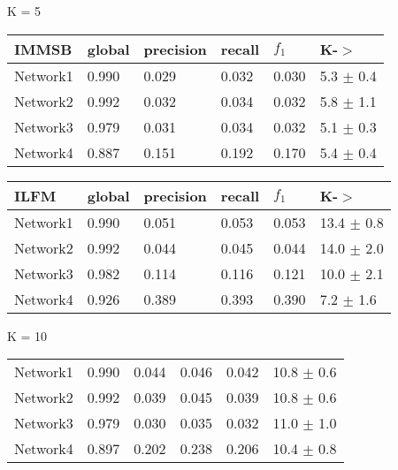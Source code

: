 

\begin{table*}[h] \label{table:unbalanced}
\caption{Predictive Performance for Synthetic datasets}
	\begin{minipage}[h]{0.45\linewidth} 
K = 5\hspace{5pt}
\begin{tabular}{llllll}
\hline
 IMMSB   &   global &   precision &   recall & $f_1$ &    K-\ensuremath{>} \\
\hline
Network1        &    0.990 &       0.029 &    0.032 & 0.030 & 5.3 $\pm$ 0.4 \\
Network2       &    0.992 &       0.032 &    0.034 &  0.032 & 5.8 $\pm$ 1.1 \\
Network3        &    0.979 &       0.031 &    0.034 & 0.032 & 5.1 $\pm$ 0.3     \\
Network4       &    0.887 &       0.151 &    0.192 &  0.170 & 5.4 $\pm$ 0.4 \\

\hline
\end{tabular}
\end{minipage}
\hspace{0.8cm}
\begin{minipage}[h]{0.45\linewidth}
\begin{tabular}{llllll}
\hline
  ILFM & global &   precision &   recall &   $f_1$ &   K-\ensuremath{>} \\
\hline
Network1      &    0.990 &       0.051 &    0.053 &  0.053 &  13.4 $\pm$ 0.8    \\
Network2     &    0.992 &       0.044 &    0.045 &   0.044 &  14.0 $\pm$ 2.0    \\
Network3      &    0.982 &       0.114 &    0.116 &  0.121 &  10.0 $\pm$ 2.1 \\
Network4     &    0.926 &       0.389 &    0.393 &   0.390 &  7.2 $\pm$ 1.6     \\

\hline
\end{tabular}
\end{minipage}


	\begin{minipage}[h]{0.45\linewidth} 
K = 10
\begin{tabular}{llllll}
Network1       &    0.990 &       0.044 &    0.046 &  0.042 & 10.8 $\pm$ 0.6 \\
Network2      &    0.992 &       0.039 &    0.045 &   0.039 & 10.8 $\pm$ 0.6 \\
Network3       &    0.979 &       0.030 &    0.035 &  0.032 & 11.0 $\pm$ 1.0 \\
Network4      &    0.897 &       0.202 &    0.238 &   0.206 & 10.4 $\pm$ 0.8 \\


\end{tabular}
\end{minipage}
\end{table*}
